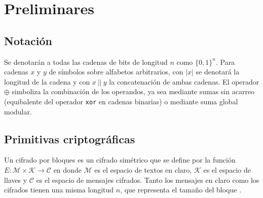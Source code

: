 %
%

\section{Preliminares}


\subsection{Notación}


Se denotarán a todas las cadenas de bits de longitud $ n $ como $ \{ 0, 1 \}^n $.
Para cadenas $ x $ y $ y $ de símbolos sobre alfabetos arbitrarios, con
$ | x | $ se denotará la longitud de la cadena y con $ x \ || \ y $ la
concatenación de ambas cadenas. El operador $ \oplus $ simboliza la combinación
de los operandos, ya sea mediante sumas sin acarreo (equibalente del operador
\texttt{xor} en cadenas binarias) o mediante suma global modular.

\subsection{Primitivas criptográficas}

Un cifrado por bloques es un cifrado simétrico que se define por la función $ E:
\mathcal{M} \times \mathcal{K} \rightarrow \mathcal{C} $ en donde $ \mathcal{M} $
es el espacio de textos en claro, $ \mathcal{K} $ es el espacio de llaves y $
\mathcal{C} $ es el espacio de mensajes cifrados. Tanto los mensajes en claro
como los cifrados tienen una misma longitud $ n $, que representa el tamaño del
bloque \cite{menezes}.



